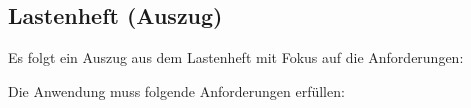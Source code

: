 \subsection{Lastenheft (Auszug)}
\label{app:Lastenheft}
Es folgt ein Auszug aus dem Lastenheft mit Fokus auf die Anforderungen:

Die Anwendung muss folgende Anforderungen erfüllen:



